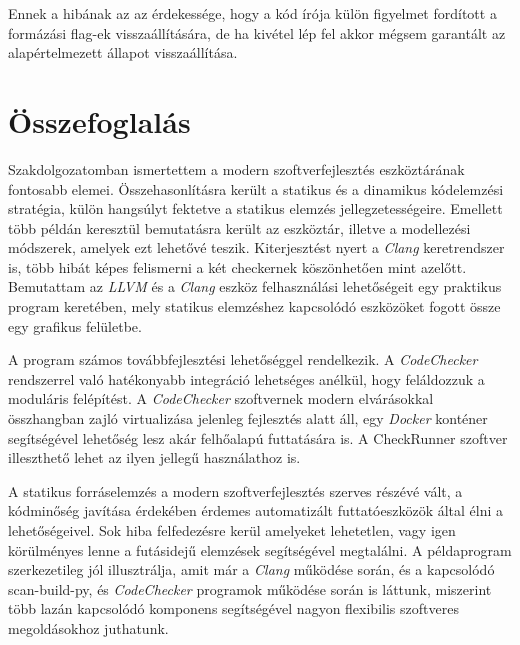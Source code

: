\documentclass[a4paper,12pt]{report}
\begin{document}
Ennek a hibának az az érdekessége, hogy a kód írója külön figyelmet fordított a formázási flag-ek visszaállítására, de ha kivétel lép fel akkor mégsem garantált az alapértelmezett állapot visszaállítása.

\chapter{Összefoglalás}
Szakdolgozatomban ismertettem a modern szoftverfejlesztés eszköztárának fontosabb elemei. Összehasonlításra került a statikus és a dinamikus kódelemzési stratégia, külön hangsúlyt fektetve a statikus elemzés jellegzetességeire. Emellett több példán keresztül bemutatásra került az eszköztár, illetve a modellezési módszerek, amelyek ezt lehetővé teszik. Kiterjesztést nyert a \emph{Clang} keretrendszer is, több hibát képes felismerni a két checkernek köszönhetően mint azelőtt. Bemutattam az \emph{LLVM} és a \emph{Clang} eszköz felhasználási lehetőségeit egy praktikus program keretében, mely statikus elemzéshez kapcsolódó eszközöket fogott össze egy grafikus felületbe.

A program számos továbbfejlesztési lehetőséggel rendelkezik. A \emph{CodeChecker} rendszerrel való hatékonyabb integráció lehetséges anélkül, hogy feláldozzuk a moduláris felépítést. A \emph{CodeChecker} szoftvernek modern elvárásokkal összhangban zajló virtualizása jelenleg fejlesztés alatt áll, egy \emph{Docker} konténer segítségével lehetőség lesz akár felhőalapú futtatására is. A CheckRunner szoftver illeszthető lehet az ilyen jellegű használathoz is.

A statikus forráselemzés a modern szoftverfejlesztés szerves részévé vált, a kódminőség javítása érdekében érdemes automatizált futtatóeszközök által élni a lehetőségeivel. Sok hiba felfedezésre kerül amelyeket lehetetlen, vagy igen körülményes lenne a futásidejű elemzések segítségével megtalálni. A példaprogram szerkezetileg jól illusztrálja, amit már a \emph{Clang} működése során, és a kapcsolódó scan-build-py, és \emph{CodeChecker} programok működése során is láttunk, miszerint több lazán kapcsolódó komponens segítségével nagyon flexibilis szoftveres megoldásokhoz juthatunk.
\end{document}
